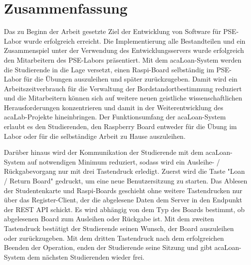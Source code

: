 \chapter{Zusammenfassung}
\label{sec:results}
Das zu Beginn der Arbeit gesetzte Ziel der Entwicklung von Software für PSE-Labor wurde erfolgreich erreicht. Die Implementierung alle Bestandteilen und ein Zusammenspiel unter der Verwendung des Entwicklungsservers wurde erfolgreich den Mitarbeitern des PSE-Labors präsentiert. Mit dem acaLoan-System werden die Studierende in die Lage versetzt, einen Raspi-Board selbständig im PSE-Labor für die Übungen auszuleihen und später zurückzugeben. Damit wird ein Arbeitszeitverbrauch für die Verwaltung der Bordstandortbestimmung reduziert und die Mitarbeitern können sich auf weitere neuen geistliche wissenschaftlichen Herausforderungen konzentrieren und damit in der Weiterentwicklung des acaLab-Projekte hineinbringen.  Der Funktionsumfang der acaLoan-System erlaubt es den Studierenden, den Raspberry Board entweder für die Übung im Labor oder für die selbständige Arbeit zu Hause auszuleihen. 

Darüber hinaus wird der Kommunikation der Studierende mit dem acaLoan-System auf notwendigen Minimum reduziert, sodass wird ein Ausleihe- / Rückgabevorgang nur mit drei Tastendruck erledigt. Zuerst wird die Taste "Loan / Return Board" gedruckt, um eine neue Benutzersitzung zu starten. Das Ablesen der Studentenkarte und Raspi-Boards geschieht ohne weitere Tastendrucken nur über das Register-Client, der die abgelesene Daten dem Server in den Endpunkt der REST API schickt. Es wird abhängig von dem Typ des Boards bestimmt, ob abgelesenen Board zum Ausleihen oder Rückgabe ist. Mit dem zweiten Tastendruck bestätigt der Studierende seinen Wunsch, der Board auszuleihen oder zurückzugeben. Mit dem dritten Tastendruck nach dem erfolgreichen Beenden der Operation, enden der Studierende seine Sitzung und gibt acaLoan-System dem nächsten Studierenden wieder frei. 

